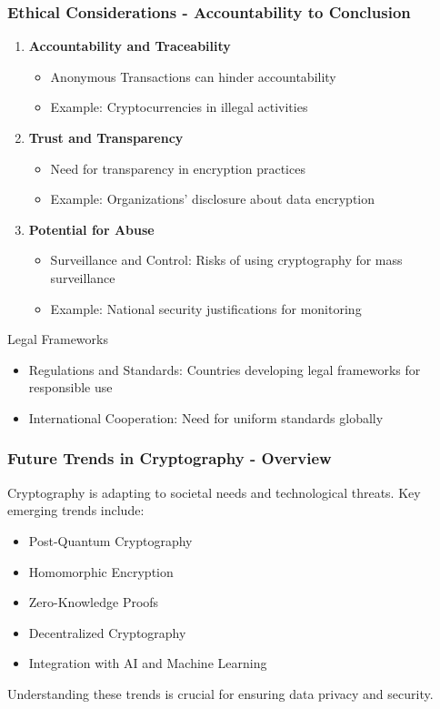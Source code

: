 \documentclass{beamer}
\begin{document}
\begin{frame}[fragile]
    \frametitle{Ethical Considerations - Accountability to Conclusion}
    \begin{enumerate}[resume]
        \item \textbf{Accountability and Traceability}
            \begin{itemize}
                \item Anonymous Transactions can hinder accountability
                \item Example: Cryptocurrencies in illegal activities
            \end{itemize}
        \item \textbf{Trust and Transparency}
            \begin{itemize}
                \item Need for transparency in encryption practices
                \item Example: Organizations' disclosure about data encryption
            \end{itemize}
        \item \textbf{Potential for Abuse}
            \begin{itemize}
                \item Surveillance and Control: Risks of using cryptography for mass surveillance
                \item Example: National security justifications for monitoring
            \end{itemize}
    \end{enumerate}
    \begin{block}{Legal Frameworks}
        \begin{itemize}
            \item Regulations and Standards: Countries developing legal frameworks for responsible use
            \item International Cooperation: Need for uniform standards globally
        \end{itemize}
    \end{block}
\end{frame}

\begin{frame}[fragile]
    \frametitle{Future Trends in Cryptography - Overview}
    Cryptography is adapting to societal needs and technological threats. 
    Key emerging trends include:
    \begin{itemize}
        \item Post-Quantum Cryptography
        \item Homomorphic Encryption
        \item Zero-Knowledge Proofs
        \item Decentralized Cryptography
        \item Integration with AI and Machine Learning
    \end{itemize}
    
    Understanding these trends is crucial for ensuring data privacy and security.
\end{frame}
\end{document}
